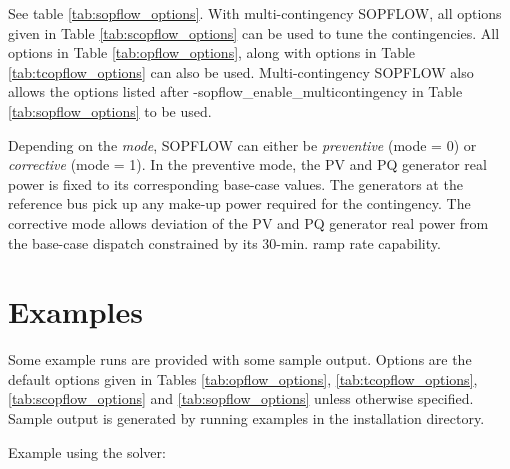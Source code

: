 See table \ref{tab:sopflow_options}. With multi-contingency SOPFLOW, all \scopflow options given in Table \ref{tab:scopflow_options} can be used to tune the contingencies. All \opflow options in Table \ref{tab:opflow_options}, along with \tcopflow options in Table \ref{tab:tcopflow_options} can also be used. Multi-contingency SOPFLOW also allows the options listed after -sopflow\_enable\_multicontingency in Table \ref{tab:sopflow_options} to be used.

Depending on the \emph{mode}, SOPFLOW can either be \emph{preventive} (mode = 0) or \emph{corrective} (mode = 1). In the preventive mode, the PV and PQ generator real power is fixed to its corresponding base-case values. The generators at the reference bus pick up any make-up power required for the contingency. The corrective mode allows deviation of the PV and PQ generator real power from the base-case dispatch constrained by its 30-min. ramp rate capability.

\section{Examples}
Some \sopflow example runs are provided with some sample output. Options are the default options given in Tables \ref{tab:opflow_options}, \ref{tab:tcopflow_options}, \ref{tab:scopflow_options} and \ref{tab:sopflow_options} unless otherwise specified. Sample output is generated by running examples in the installation directory.

Example using the \ipopt solver:

